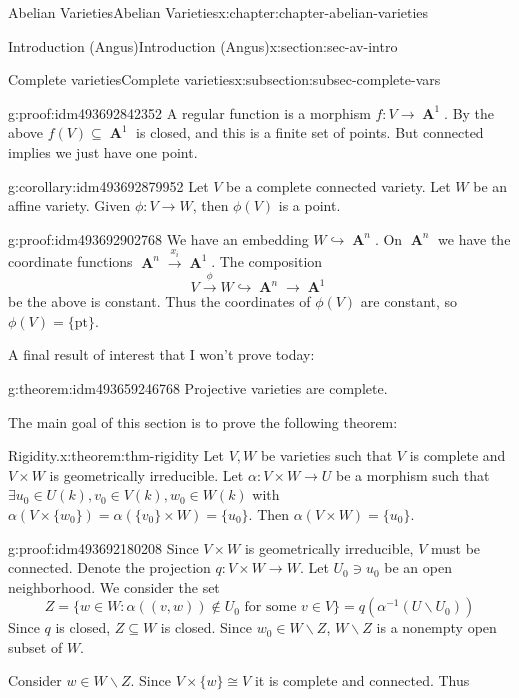 \documentclass[oneside,10pt,]{book}
\numberwithin{equation}{section}
\DeclareMathOperator{\aff}{\mathbf{A}}
\begin{document}
\begin{chapterptx}{Abelian Varieties}{}{Abelian Varieties}{}{}{x:chapter:chapter-abelian-varieties}
\begin{sectionptx}{Introduction (Angus)}{}{Introduction (Angus)}{}{}{x:section:sec-av-intro}
\begin{subsectionptx}{Complete varieties}{}{Complete varieties}{}{}{x:subsection:subsec-complete-vars}
\begin{proofptx}{}{g:proof:idm493692842352}
A regular function is a morphism \(f\colon V \to \aff^1\). By the above \(f(V) \subseteq \aff^1\) is closed, and this is a finite set of points. But connected implies we just have one point.%
\end{proofptx}
\begin{corollary}{}{}{g:corollary:idm493692879952}%
Let \(V \) be a complete connected variety. Let \(W\) be an affine variety. Given \(\phi\colon V\to W\), then \(\phi (V)\) is a point.%
\end{corollary}
\begin{proofptx}{}{g:proof:idm493692902768}
We have an embedding \(W \hookrightarrow \aff^n\). On \(\aff^n\) we have the coordinate functions \(\aff^n \xrightarrow{x_i} \aff^1\). The composition%
\begin{equation*}
V \xrightarrow\phi W \hookrightarrow\aff^n \to \aff^1
\end{equation*}
be the above is constant. Thus the coordinates of \(\phi(V)\) are constant, so \(\phi(V) = \{\text{pt}\}\).%
\end{proofptx}
A final result of interest that I won't prove today:%
\begin{theorem}{}{}{g:theorem:idm493659246768}%
Projective varieties are complete.%
\end{theorem}
The main goal of this section is to prove the following theorem:%
\begin{theorem}{Rigidity.}{}{x:theorem:thm-rigidity}%
Let \(V,W\) be varieties such that \(V\) is complete and  \(V\times W\) is geometrically irreducible. Let \(\alpha\colon V\times W \to U\) be a morphism such that \(\exists u_0\in U(k), v_0\in V(k), w_0\in W(k)\) with \(\alpha(V\times\{w_0\}) = \alpha (\{v_0\}\times W ) = \{u_0\}\). Then \(\alpha (V\times W) = \{u_0\}\).%
\end{theorem}
\begin{proofptx}{}{g:proof:idm493692180208}
Since \(V\times W\) is geometrically irreducible, \(V\) must be connected. Denote the projection \(q\colon V\times W \to W\). Let \(U_0 \ni u_0\) be an open neighborhood. We consider the set%
\begin{equation*}
Z = \{w\in W : \alpha((v,w)) \not\in U_0 \text{ for some } v\in V\} = q(\alpha^{-1}(U\smallsetminus U_0))
\end{equation*}
Since \(q\) is closed, \(Z\subseteq W\) is closed. Since \(w_0\in W\smallsetminus Z\), \(W\smallsetminus Z\) is a nonempty open subset of \(W\).%
\par
Consider \(w \in W\smallsetminus Z\). Since \(V\times\{w\} \cong V\) it is complete and connected. Thus%

\end{proofptx}
\end{subsectionptx}
\end{sectionptx}
\end{chapterptx}
\end{document}
